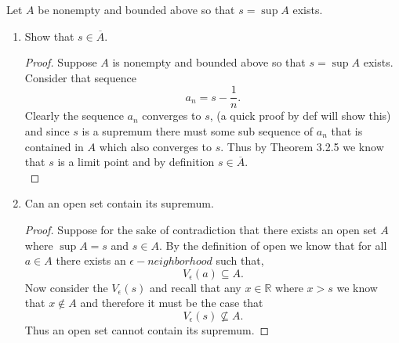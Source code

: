 \documentclass[12pt]{article}
\makeatletter
\theoremstyle{homework}
\newenvironment{exercise}[1]
{\def\@currentlabel{#1}\exercisecore}
{\endexercisecore}
\newcommand{\Reals}{\ensuremath{\mathbb R}}
\makeatother
\begin{document}
\begin{exercise}{3.2.4} Let $A$ be nonempty and bounded above so that $s = \sup A$ exists. \\
  \begin{enumerate}
    \item Show that $s \in \overline{A}$.\\
    
    \begin{proof}
      Suppose $A$ is nonempty and bounded above so that $s = \sup A$ exists. Consider that sequence \
      \begin{equation*}
        a_n = s - \dfrac{1}{n}.
      \end{equation*}
      Clearly the sequence $a_n$ converges to $s$, (a quick proof by def will show this) and since $s$ is a supremum
      there must some sub sequence of $a_n$ that is contained in $A$ which also converges to $s$. Thus by Theorem 3.2.5
       we know that $s$ is a limit point and by definition $s \in \overline{A}$.\\
    \end{proof}

    
    \vspace{.25in}



    \item Can an open set contain its supremum.\\
    
    \begin{proof}
      Suppose for the sake of contradiction that there exists an open set $A$ where $\sup A = s$ and $s \in A$.
      By the definition of open we know that for all $a \in A$ there exists an $\epsilon-neighborhood$ such that,
      \begin{equation*}
        V_{\epsilon}(a) \subseteq A.
      \end{equation*}
      Now consider the $V_{\epsilon}(s)$ and recall that any $x \in \Reals$ where $x>s$ we know that $x \notin A$ and therefore it must be the case that
      \begin{equation*}
        V_{\epsilon}(s) \not\subseteq A.
      \end{equation*} 
      Thus an open set cannot contain its supremum.  

    \end{proof}
    





  \end{enumerate} 
\end{exercise}
\end{document}
